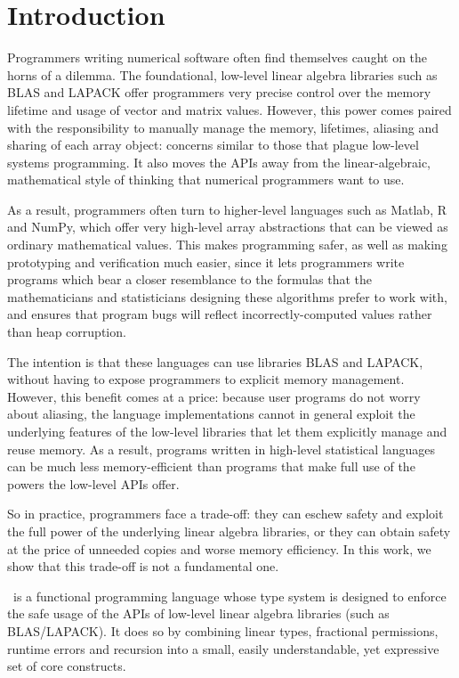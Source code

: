 \section{Introduction}

Programmers writing numerical software often find themselves caught on
the horns of a dilemma. The foundational, low-level linear algebra
libraries such as BLAS and LAPACK offer programmers very precise
control over the memory lifetime and usage of vector and matrix
values. However, this power comes paired with the responsibility to
manually manage the memory, lifetimes, aliasing and sharing of each array
object: concerns similar to those that plague low-level systems
programming. It also moves the APIs away from the linear-algebraic,
mathematical style of thinking that numerical programmers want to use.

As a result, programmers often turn to higher-level languages such as
Matlab, R and NumPy, which offer very high-level array abstractions
that can be viewed as ordinary mathematical values. This makes
programming safer, as well as making prototyping and verification much
easier, since it lets programmers write programs which bear a closer
resemblance to the formulas that the mathematicians and statisticians
designing these algorithms prefer to work with, and ensures that
program bugs will reflect incorrectly-computed values rather than heap
corruption.

The intention is that these languages can use libraries BLAS and
LAPACK, without having to expose programmers to explicit memory
management. However, this benefit comes at a price: because user
programs do not worry about aliasing, the language implementations
cannot in general exploit the underlying features of the low-level
libraries that let them explicitly manage and reuse memory. As a
result, programs written in high-level statistical languages can
be much less memory-efficient than programs that make full use
of the powers the low-level APIs offer. 

So in practice, programmers face a trade-off: they can eschew safety
and exploit the full power of the underlying linear algebra libraries,
or they can obtain safety at the price of unneeded copies and worse
memory efficiency. In this work, we show that this trade-off is not a
fundamental one.

\lang\ is a functional programming language whose type system is
designed to enforce the safe usage of the APIs of low-level linear algebra
libraries (such as BLAS/LAPACK).  It does so by combining linear types,
fractional permissions, runtime errors and recursion into a small, easily
understandable, yet expressive set of core constructs.

